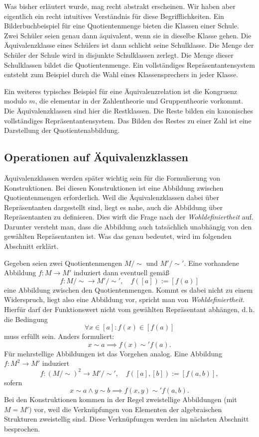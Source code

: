 Was bisher erläutert wurde, mag recht abstrakt erscheinen. Wir haben
aber eigentlich ein recht intuitives Verständnis für diese
Begrifflichkeiten. Ein Bilderbuchbeispiel für eine Quotientenmenge
bieten die Klassen einer Schule. Zwei Schüler seien genau dann
äquivalent, wenn sie in dieselbe Klasse gehen. Die Äquivalenzklasse eines
Schülers ist dann schlicht seine Schulklasse. Die Menge der Schüler der
Schule wird in disjunkte Schulklassen zerlegt. Die Menge dieser
Schulklassen bildet die Quotientenmenge. Ein vollständiges
Repräsentantensystem entsteht zum Beispiel durch die Wahl eines
Klassensprechers in jeder Klasse.

Ein weiteres typisches Beispiel für eine Äquivalenzrelation ist die
Kongruenz modulo $m$, die elementar in der Zahlentheorie
und Gruppentheorie vorkommt. Die Äquivalenzklassen sind hier die
Restklassen. Die Reste bilden ein kanonisches vollständiges
Repräsentantensystem. Das Bilden des Restes zu einer Zahl ist
eine Darstellung der Quotientenabbildung.

\subsection{Operationen auf Äquivalenzklassen}

Äquivalenzklassen werden später wichtig sein für die Formulierung von
Konstruktionen. Bei diesen Konstruktionen ist eine Abbildung
zwischen Quotientenmengen erforderlich. Weil die Äquivalenzklassen
dabei über Repräsentanten dargestellt sind, liegt es nahe, auch
die Abbildung über Repräsentanten zu definieren. Dies wirft die
Frage nach der \emph{Wohldefiniertheit} auf.
Darunter versteht man, dass die Abbildung auch tatsächlich unabhängig
von den gewählten Repräsentanten ist. Was das genau bedeutet, wird im
folgenden Abschnitt erklärt.

Gegeben seien zwei Quotientenmengen $M/\sim$ und $M'/\sim'$.
Eine vorhandene Abbildung $f\colon M\to M'$ induziert dann
eventuell gemäß%
\[f\colon M/\sim\to M'/\sim',\quad f([a]):=[f(a)]\]
eine Abbildung zwischen den Quotientenmengen. Kommt es dabei nicht
zu einem Widerspruch, liegt also eine Abbildung vor, spricht man
von \emph{Wohldefiniertheit}. Hierfür darf der Funktionswert nicht
vom gewählten Repräsentant abhängen, d.\,h. die Bedingung%
\[\forall x\in [a]\colon f(x)\in [f(a)]\]
muss erfüllt sein. Anders formuliert:
\[x\sim a \implies f(x)\sim' f(a).\]
Für mehrstellige Abbildungen ist das Vorgehen analog. Eine
Abbildung $f\colon M^2\to M'$ induziert%
\[f\colon (M/\sim)^2\to M'/\sim',\quad f([a],[b]):=[f(a,b)],\]
sofern
\[x\sim a\land y\sim b\implies f(x,y)\sim' f(a,b).\]
Bei den Konstruktionen kommen in der Regel zweistellige Abbildungen
(mit $M=M'$) vor, weil die Verknüpfungen von Elementen der algebraischen
Strukturen zweistellig sind. Diese Verknüpfungen werden im nächsten
Abschnitt besprochen.

